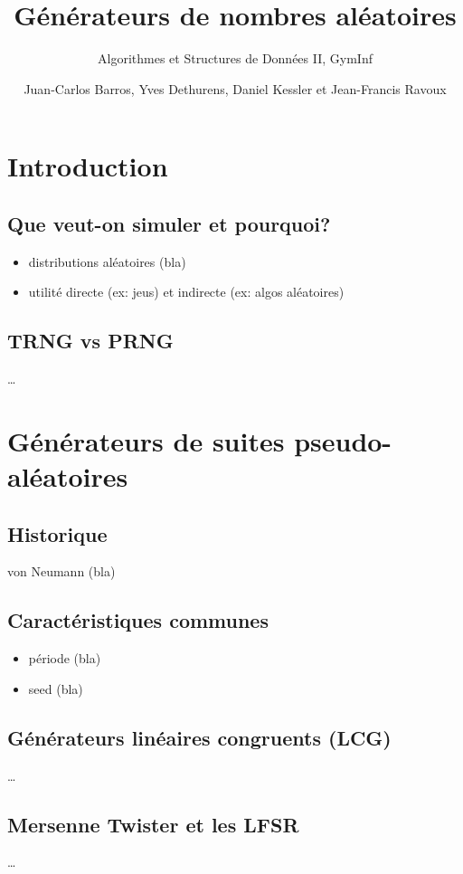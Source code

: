 \documentclass{scrartcl}
\title{Générateurs de nombres aléatoires}
\subtitle{Algorithmes et Structures de Données II, GymInf}
\author{Juan-Carlos Barros, Yves Dethurens, Daniel Kessler et Jean-Francis Ravoux}
\begin{document}
\maketitle

\tableofcontents

\section{Introduction}
\subsection{Que veut-on simuler et pourquoi?}
\begin{itemize}
\item distributions aléatoires (bla)
\item utilité directe (ex: jeus) et indirecte (ex: algos aléatoires)
\end{itemize}

\subsection{TRNG vs PRNG}
\ldots

\section{Générateurs de suites pseudo-aléatoires}
\subsection{Historique}
von Neumann\cite{VonNeumann} (bla)

\subsection{Caractéristiques communes}
\begin{itemize}
\item période (bla)
\item seed (bla)
\end{itemize}

\subsection{Générateurs linéaires congruents (LCG)}
\ldots

\subsection{Mersenne Twister et les LFSR}
\ldots
\end{document}
